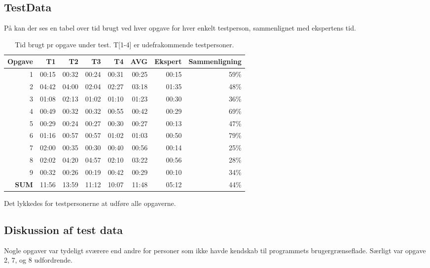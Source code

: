\subsection{TestData}
På  kan der ses en tabel over tid brugt ved hver opgave for hver enkelt testperson, sammenlignet med ekspertens tid.

\begin{table}[htbp]
  \centering
  \caption{Tid brugt pr opgave under test. T[1-4] er udefrakommende testpersoner.}
    \begin{tabular}{r|rrrr|r|r|r}
    \textbf{Opgave} & T1     & T2     & T3     & T4     & \textbf{AVG} & \textbf{Ekspert} & \textbf{Sammenligning} \\ \hline
    1     & 00:15 & 00:32 & 00:24 & 00:31 & 00:25 & 00:15 & 59\% \\
    2     & 04:42 & 04:00 & 02:04 & 02:27 & 03:18 & 01:35 & 48\% \\
    3     & 01:08 & 02:13 & 01:02 & 01:10 & 01:23 & 00:30 & 36\% \\
    4     & 00:49 & 00:32 & 00:32 & 00:55 & 00:42 & 00:29 & 69\% \\
    5     & 00:29 & 00:24 & 00:27 & 00:30 & 00:27 & 00:13 & 47\% \\
    6     & 01:16 & 00:57 & 00:57 & 01:02 & 01:03 & 00:50 & 79\% \\
    7     & 02:00 & 00:35 & 00:30 & 00:40 & 00:56 & 00:14 & 25\% \\
    8     & 02:02 & 04:20 & 04:57 & 02:10 & 03:22 & 00:56 & 28\% \\
    9     & 00:32 & 00:26 & 00:19 & 00:42 & 00:29 & 00:10 & 34\% \\ \hline
    \textbf{SUM} & 11:56 & 13:59 & 11:12 & 10:07 & 11:48 & 05:12 & 44\% \\
    \end{tabular}%
  \label{tab:TestTimeTable}%
\end{table}%

Det lykkedes for testpersonerne at udføre alle opgaverne.

\subsection{Diskussion af test data}

Nogle opgaver var tydeligt sværere end andre for personer som ikke havde kendskab til programmets brugergrænseflade. 
Særligt var opgave 2, 7, og 8 udfordrende.


